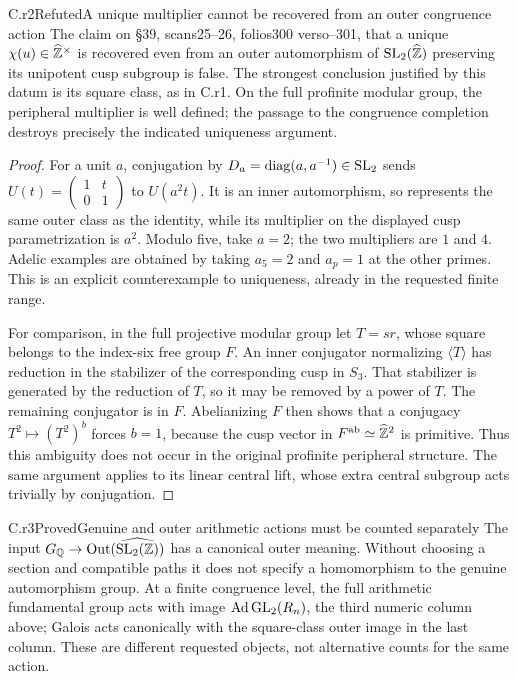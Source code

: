 \begin{claim}{C.r2}{Refuted}{A unique multiplier cannot be recovered from an outer congruence action}
The claim on \S39, scans25--26, folios300 verso--301, that a unique
$\chi(u)\in\widehat{\mathbb Z}^\times$ is recovered even from an outer automorphism
of $\operatorname{SL}_2(\widehat{\mathbb Z})$ preserving its unipotent cusp subgroup is false.
The strongest conclusion justified by this datum is its square class,
as in C.r1. On the full profinite modular group, the peripheral
multiplier is well defined; the passage to the congruence completion
destroys precisely the indicated uniqueness argument.
\end{claim}
\begin{proof}
For a unit $a$, conjugation by
$D_a=\operatorname{diag}(a,a^{-1})\in\operatorname{SL}_2$ sends
$U(t)=\left(\begin{smallmatrix}1&t\\0&1\end{smallmatrix}\right)$ to
$U(a^2t)$. It is an inner automorphism, so represents the same outer
class as the identity, while its multiplier on the displayed cusp
parametrization is $a^2$. Modulo five, take $a=2$; the two multipliers
are $1$ and $4$. Adelic examples are obtained by taking $a_5=2$ and
$a_p=1$ at the other primes. This is an explicit counterexample to
uniqueness, already in the requested finite range.

For comparison, in the full projective modular group let
$T=sr$, whose square belongs to the index-six free group $F$.
An inner conjugator normalizing $\langle T\rangle$ has reduction in
the stabilizer of the corresponding cusp in $S_3$. That stabilizer is
generated by the reduction of $T$, so it may be removed by a power
of $T$. The remaining conjugator is in $F$. Abelianizing $F$ then
shows that a conjugacy $T^2\mapsto (T^2)^b$ forces $b=1$, because
the cusp vector in $F^{\rm ab}\simeq\widehat{\mathbb Z}^2$ is primitive. Thus this
ambiguity does not occur in the original profinite peripheral structure.
The same argument applies to its linear central lift, whose extra
central subgroup acts trivially by conjugation.
\end{proof}

\begin{claim}{C.r3}{Proved}{Genuine and outer arithmetic actions must be counted separately}
The input $G_\mathbb Q\to\operatorname{Out}(\widehat{\operatorname{SL}_2(\mathbb Z)})$ has a
canonical outer meaning. Without choosing a section and compatible
paths it does not specify a homomorphism to the genuine automorphism
group. At a finite congruence level, the full arithmetic fundamental
group acts with image $\operatorname{Ad}\operatorname{GL}_2(R_n)$, the third numeric column above;
Galois acts canonically with the square-class outer image in the last
column. These are different requested objects, not alternative counts
for the same action.
\end{claim}

